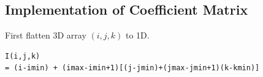 \documentclass{article}
\numberwithin{equation}{subsection}
\begin{document}

\subsection{Implementation of Coefficient Matrix}
First flatten 3D array $(i,j,k)$ to 1D.

\begin{lstlisting}[frame=single]
I(i,j,k) 
= (i-imin) + (imax-imin+1)[(j-jmin)+(jmax-jmin+1)(k-kmin)]
\end{lstlisting}
\end{document}
